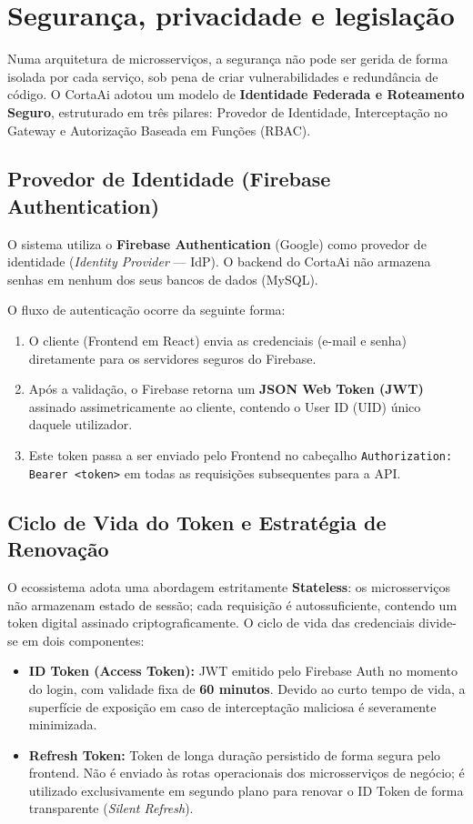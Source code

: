 \documentclass[
    12pt, 
    a4paper, 
    oneside, 
    chapter=TITLE, 
    section=TITLE
]{abntex2}
\begin{document}
\section{Segurança, privacidade e legislação}
Numa arquitetura de microsserviços, a segurança não pode ser gerida de forma isolada por cada serviço, sob pena de criar vulnerabilidades e redundância de código. O CortaAi adotou um modelo de \textbf{Identidade Federada e Roteamento Seguro}, estruturado em três pilares: Provedor de Identidade, Interceptação no Gateway e Autorização Baseada em Funções (RBAC).

\subsection{Provedor de Identidade (Firebase Authentication)}
O sistema utiliza o \textbf{Firebase Authentication} (Google) como provedor de identidade (\textit{Identity Provider} — IdP). O backend do CortaAi não armazena senhas em nenhum dos seus bancos de dados (MySQL).

O fluxo de autenticação ocorre da seguinte forma:
\begin{enumerate}
    \item O cliente (Frontend em React) envia as credenciais (e-mail e senha) diretamente para os servidores seguros do Firebase.
    \item Após a validação, o Firebase retorna um \textbf{JSON Web Token (JWT)} assinado assimetricamente ao cliente, contendo o User ID (UID) único daquele utilizador.
    \item Este token passa a ser enviado pelo Frontend no cabeçalho \texttt{Authorization: Bearer <token>} em todas as requisições subsequentes para a API.
\end{enumerate}

\subsection{Ciclo de Vida do Token e Estratégia de Renovação}
O ecossistema adota uma abordagem estritamente \textbf{Stateless}: os microsserviços não armazenam estado de sessão; cada requisição é autossuficiente, contendo um token digital assinado criptograficamente. O ciclo de vida das credenciais divide-se em dois componentes:
\begin{itemize}
    \item \textbf{ID Token (Access Token):} JWT emitido pelo Firebase Auth no momento do login, com validade fixa de \textbf{60 minutos}. Devido ao curto tempo de vida, a superfície de exposição em caso de interceptação maliciosa é severamente minimizada.
    \item \textbf{Refresh Token:} Token de longa duração persistido de forma segura pelo frontend. Não é enviado às rotas operacionais dos microsserviços de negócio; é utilizado exclusivamente em segundo plano para renovar o ID Token de forma transparente (\textit{Silent Refresh}).
\end{itemize}
\end{document}
